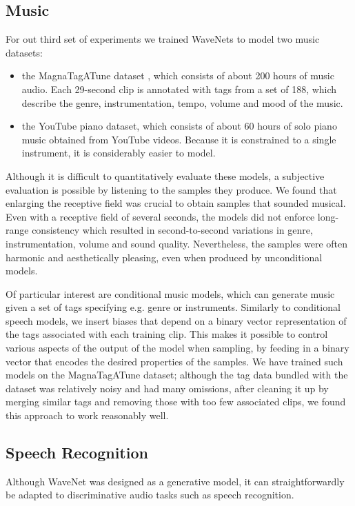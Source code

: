 \documentclass{article}
\begin{document}
\subsection{Music}

For out third set of experiments we trained WaveNets to model two music datasets:
\begin{itemize}
    \item the MagnaTagATune dataset \citep{law2009input}, which consists of about 200 hours of music audio. Each 29-second clip is annotated with tags from a set of 188, which describe the genre, instrumentation, tempo, volume and mood of the music.
    \item the YouTube piano dataset, which consists of about 60 hours of solo piano music obtained from YouTube videos. Because it is constrained to a single instrument, it is considerably easier to model.
\end{itemize}
Although it is difficult to quantitatively evaluate these models, a subjective evaluation is possible by listening to the samples they produce.
We found that enlarging the receptive field was crucial to obtain samples that sounded musical. Even with a receptive field of several seconds, the models did not enforce long-range consistency which resulted in second-to-second variations in genre, instrumentation, volume and sound quality. Nevertheless, the samples were often harmonic and aesthetically pleasing, even when produced by unconditional models.

Of particular interest are conditional music models, which can generate music given a set of tags specifying e.g. genre or instruments. Similarly to conditional speech models, we insert biases that depend on a binary vector representation of the tags associated with each training clip. This makes it possible to control various aspects of the output of the model when sampling, by feeding in a binary vector that encodes the desired properties of the samples. We have trained such models on the MagnaTagATune dataset; although the tag data bundled with the dataset was relatively noisy and had many omissions, after cleaning it up by merging similar tags and removing those with too few associated clips, we found this approach to work reasonably well.

\subsection{Speech Recognition}

Although WaveNet was designed as a generative model, it can straightforwardly be adapted to discriminative audio tasks such as speech recognition. 
\end{document}

